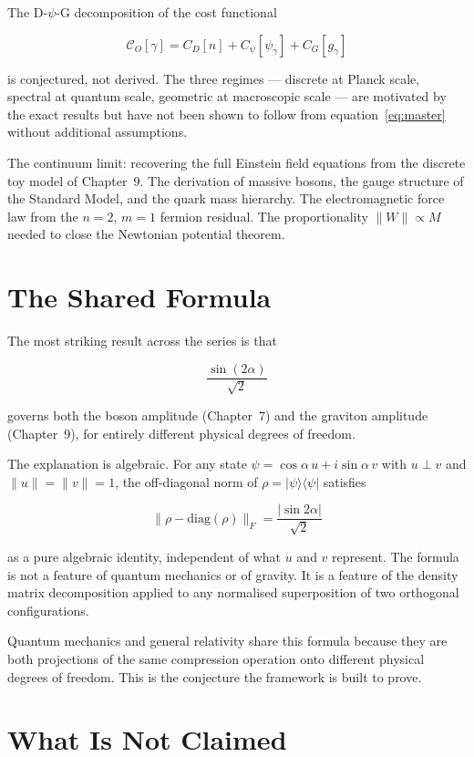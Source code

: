 The D-$\psi$-G decomposition of the cost functional

\[
\mathcal{C}_O[\gamma] = C_D[n] + C_\psi[\psi_\gamma] + C_G[g_\gamma]
\]

is conjectured, not derived. The three regimes --- discrete at Planck
scale, spectral at quantum scale, geometric at macroscopic scale ---
are motivated by the exact results but have not been shown to follow
from equation~\eqref{eq:master} without additional assumptions.

The continuum limit: recovering the full Einstein field equations from
the discrete toy model of Chapter~9. The derivation of massive bosons,
the gauge structure of the Standard Model, and the quark mass
hierarchy. The electromagnetic force law from the $n=2$, $m=1$ fermion
residual. The proportionality $\|W\| \propto M$ needed to close the
Newtonian potential theorem.

\section{The Shared Formula}

The most striking result across the series is that

\[
\frac{\sin(2\alpha)}{\sqrt{2}}
\]

governs both the boson amplitude (Chapter~7) and the graviton
amplitude (Chapter~9), for entirely different physical degrees of
freedom.

The explanation is algebraic. For any state
$\psi = \cos\alpha\,u + i\sin\alpha\,v$ with $u \perp v$ and $\|u\|
= \|v\| = 1$, the off-diagonal norm of $\rho = |\psi\rangle\langle\psi|$
satisfies

\[
\|\rho - \mathrm{diag}(\rho)\|_F = \frac{|\sin 2\alpha|}{\sqrt{2}}
\]

as a pure algebraic identity, independent of what $u$ and $v$
represent. The formula is not a feature of quantum mechanics or of
gravity. It is a feature of the density matrix decomposition applied
to any normalised superposition of two orthogonal configurations.

Quantum mechanics and general relativity share this formula because
they are both projections of the same compression operation onto
different physical degrees of freedom. This is the conjecture the
framework is built to prove.

\section{What Is Not Claimed}

